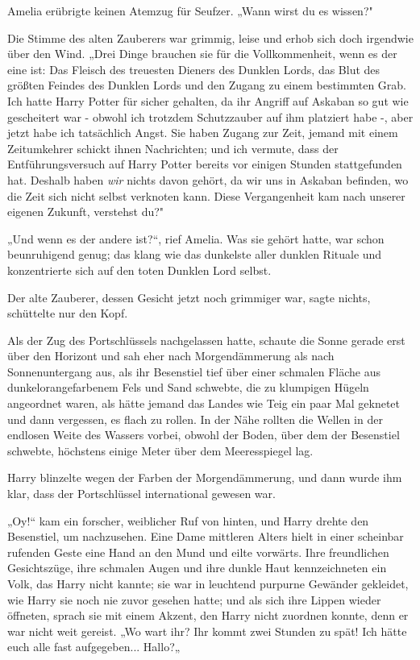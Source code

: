 {Amelia erübrigte keinen Atemzug für Seufzer. „Wann wirst du es wissen?"

Die Stimme des alten Zauberers war grimmig, leise und erhob sich doch irgendwie über den Wind. „Drei Dinge brauchen sie für die Vollkommenheit, wenn es der eine ist: Das Fleisch des treuesten Dieners des Dunklen Lords, das Blut des größten Feindes des Dunklen Lords und den Zugang zu einem bestimmten Grab. Ich hatte Harry Potter für sicher gehalten, da ihr Angriff auf Askaban so gut wie gescheitert war - obwohl ich trotzdem Schutzzauber auf ihm platziert habe -, aber jetzt habe ich tatsächlich Angst. Sie haben Zugang zur Zeit, jemand mit einem Zeitumkehrer schickt ihnen Nachrichten; und ich vermute, dass der Entführungsversuch auf Harry Potter bereits vor einigen Stunden stattgefunden hat. Deshalb haben \emph{wir} nichts davon gehört, da wir uns in Askaban befinden, wo die Zeit sich nicht selbst verknoten kann. Diese Vergangenheit kam nach unserer eigenen Zukunft, verstehst du?"

„Und wenn es der andere ist?“, rief Amelia. Was sie gehört hatte, war schon beunruhigend genug; das klang wie das dunkelste aller dunklen Rituale und konzentrierte sich auf den toten Dunklen Lord selbst.

Der alte Zauberer, dessen Gesicht jetzt noch grimmiger war, sagte nichts, schüttelte nur den Kopf.

Als der Zug des Portschlüssels nachgelassen hatte, schaute die Sonne gerade erst über den Horizont und sah eher nach Morgendämmerung als nach Sonnenuntergang aus, als ihr Besenstiel tief über einer schmalen Fläche aus dunkelorangefarbenem Fels und Sand schwebte, die zu klumpigen Hügeln angeordnet waren, als hätte jemand das Landes wie Teig ein paar Mal geknetet und dann vergessen, es flach zu rollen. In der Nähe rollten die Wellen in der endlosen Weite des Wassers vorbei, obwohl der Boden, über dem der Besenstiel schwebte, höchstens einige Meter über dem Meeresspiegel lag.

Harry blinzelte wegen der Farben der Morgendämmerung, und dann wurde ihm klar, dass der Portschlüssel international gewesen war.

„Oy!“ kam ein forscher, weiblicher Ruf von hinten, und Harry drehte den Besenstiel, um nachzusehen. Eine Dame mittleren Alters hielt in einer scheinbar rufenden Geste eine Hand an den Mund und eilte vorwärts. Ihre freundlichen Gesichtszüge, ihre schmalen Augen und ihre dunkle Haut kennzeichneten ein Volk, das Harry nicht kannte; sie war in leuchtend purpurne Gewänder gekleidet, wie Harry sie noch nie zuvor gesehen hatte; und als sich ihre Lippen wieder öffneten, sprach sie mit einem Akzent, den Harry nicht zuordnen konnte, denn er war nicht weit gereist. „Wo wart ihr? Ihr kommt zwei Stunden zu spät! Ich hätte euch alle fast aufgegeben... Hallo?„

}
